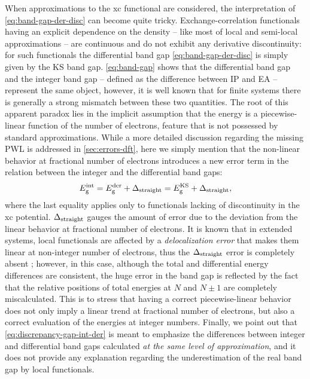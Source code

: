When approximations to the xc functional are considered, the interpretation of \cref{eq:band-gap-der-disc} can become quite tricky. Exchange-correlation functionals having an explicit dependence on the density -- like most of local and semi-local approximations -- are continuous and do not exhibit any derivative discontinuity: for such functionals the differential band gap \eqref{eq:band-gap-der-disc} is simply given by the KS band gap. \cref{eq:band-gap} shows that the differential band gap and the integer band gap -- defined as the difference between IP and EA -- represent the same object, however, it is well known that for finite systems there is generally a strong mismatch between these two quantities. The root of this apparent paradox lies in the implicit assumption that the energy is a piecewise-linear function of the number of electrons, feature that is not possessed by standard approximations. While a more detailed discussion regarding the missing PWL is addressed in \cref{sec:errors-dft}, here we simply mention that the non-linear behavior at fractional number of electrons introduces a new error term in the relation between the integer and the differential band gaps:  
%
\begin{equation}
    E_{\rm g}^{\rm int} = E_{\rm g}^{\rm der} + \Delta_{\rm straight} = E_{\rm g}^{\rm KS} + \Delta_{\rm straight},
    \label{eq:discrepancy-gap-int-der}
\end{equation}
%
where the last equality applies only to functionals lacking of discontinuity in the xc potential. $\Delta_{\rm straight}$ gauges the amount of error due to the deviation from the linear behavior at fractional number of electrons. It is known that in extended systems, local functionals are affected by a \emph{delocalization error} that makes them linear at non-integer number of electrons, thus the $\Delta_{\rm straight}$ error is completely absent  \cite{mori-sanchez_localization_2008}; however, in this case, although the total and differential energy differences are consistent, the huge error in the band gap is reflected by the fact that the relative positions of total energies at $N$ and $N \pm 1$ are completely miscalculated. This is to stress that having a correct piecewise-linear behavior does not only imply a linear trend at fractional number of electrons, but also a correct evaluation of the energies at integer numbers. Finally, we point out that \cref{eq:discrepancy-gap-int-der} is meant to emphasize the differences between integer and differential band gaps calculated \emph{at the same level of approximation}, and it does not provide any explanation regarding the underestimation of the real band gap by local functionals.

